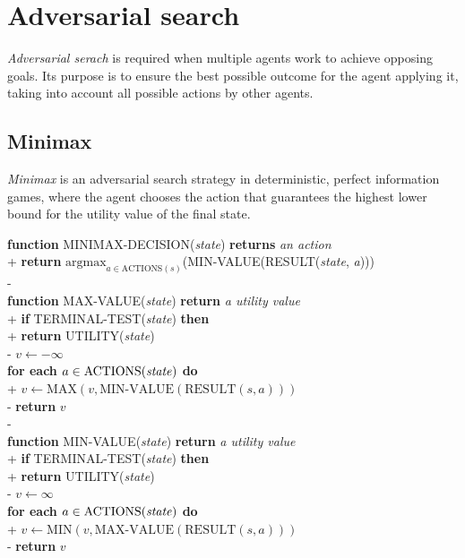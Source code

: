 \documentclass{article}
\begin{document}
\section{Adversarial search}


\begin{definition}
    \emph{Adversarial serach} is required when multiple agents work to achieve 
    opposing goals. Its purpose is to ensure the best possible outcome for the
    agent applying it, taking into account all possible actions by other agents.
\end{definition}

\subsection{Minimax}

\begin{definition}
    \emph{Minimax} is an adversarial search strategy in deterministic, perfect
    information games, where the agent chooses the action that guarantees the
    highest lower bound for the utility value of the final state.

    \begin{pseudo}
        \textbf{function} MINIMAX-DECISION(\emph{state}) \textbf{returns} \emph{an action}\\+
            \textbf{return} $\text{argmax}_{a\in\text{ACTIONS}(s)}$(MIN-VALUE(RESULT(\emph{state}, \emph{a})))\\-
        \\
        \textbf{function} MAX-VALUE(\emph{state}) \textbf{return} \emph{a utility value}\\+
            \textbf{if} TERMINAL-TEST(\emph{state}) \textbf{then}\\+
                \textbf{return} UTILITY(\emph{state})\\-
            $v\leftarrow-\infty$\\
            \textbf{for each} $a\in\text{ACTIONS(\emph{state})}$ \textbf{do}\\+
                $v\leftarrow \text{MAX}(v, \text{MIN-VALUE}(\text{RESULT}(s, a)))$\\-
            \textbf{return} $v$\\-
        \\
        \textbf{function} MIN-VALUE(\emph{state}) \textbf{return} \emph{a utility value}\\+
            \textbf{if} TERMINAL-TEST(\emph{state}) \textbf{then}\\+
                \textbf{return} UTILITY(\emph{state})\\-
            $v\leftarrow\infty$\\
            \textbf{for each} $a\in\text{ACTIONS(\emph{state})}$ \textbf{do}\\+
                $v\leftarrow \text{MIN}(v, \text{MAX-VALUE}(\text{RESULT}(s, a)))$\\-
            \textbf{return} $v$
    \end{pseudo}
\end{definition}
\end{document}
